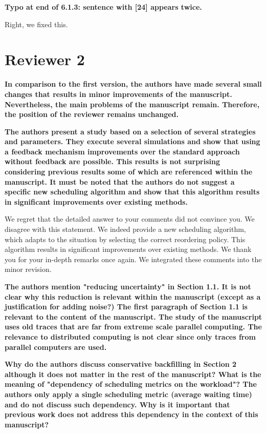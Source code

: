 \documentclass[]{article}
\begin{document}
\medskip


\textbf{Typo at end of 6.1.3: sentence with [24] appears twice.
}

Right, we fixed this.

\medskip


\section{Reviewer 2}

\textbf{In comparison to the first version, the authors have made several small changes that results in minor improvements of
the manuscript. Nevertheless, the main problems of the manuscript remain. Therefore, the position of the reviewer
remains unchanged.
}

\textbf{The authors present a study based on a selection of several strategies and parameters. They execute several simulations
and show that using a feedback mechanism improvements over the standard approach without feedback are possible. This
results is not surprising considering previous results some of which are referenced within the manuscript. It must be
noted that the authors do not suggest a specific new scheduling algorithm and show that this algorithm results in
significant improvements over existing methods.
}

We regret that the detailed answer to your comments did not convince you. We disagree with this statement. We indeed
provide a new scheduling algorithm, which adapts to the situation by selecting the correct reordering policy. This algorithm
results in significant improvements over existing methods.
We thank you for your in-depth remarks once again. We integrated these comments into the minor revision.

\medskip

\textbf{The authors mention "reducing uncertainty" in Section 1.1. It is not clear why this reduction is relevant within the
manuscript (except as a justification for adding noise?)
The first paragraph of Section 1.1 is relevant to the content of the manuscript. The study of the manuscript uses old
traces that are far from extreme scale parallel computing. The relevance to distributed computing is not clear since
only traces from parallel computers are used.
}

\textbf{Why do the authors discuss conservative backfilling in Section 2 although it does not matter in the rest of the
manuscript?
What is the meaning of "dependency of scheduling metrics on the workload"? The authors only apply a single scheduling
metric (average waiting time) and do not discuss such dependency. Why is it important that previous work does not
address this dependency in the context of this manuscript?
}
\end{document}
